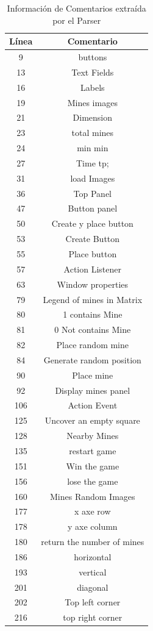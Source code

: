 \documentclass[a4paper,12pt]{report}
\begin{document}
\begin{center}
	\begin{table}[t]
	
		\centering
   		\begin{tabular}{| c | c |}      
       \hline
  	   \textsf{Línea} & \textsf{Comentario} \\ \hline
9&buttons \\ \hline
13&Text Fields \\ \hline
16&Labels \\ \hline
19&Mines images \\ \hline
21&Dimension \\ \hline
23&total mines \\ \hline
24&min min \\ \hline
27&Time tp; \\ \hline
31&load Images \\ \hline
36&Top Panel \\ \hline
47&Button panel \\ \hline
50&Create y place button \\ \hline
53&Create Button \\ \hline
55&Place button \\ \hline
57&Action Listener \\ \hline
63&Window properties \\ \hline
79&Legend of mines in Matrix \\ \hline
80&1 contains Mine \\ \hline
81&0 Not contains Mine \\ \hline
82&Place random mine \\ \hline
84&Generate random position \\ \hline
90&Place mine \\ \hline
92&Display mines panel \\ \hline
106&Action Event \\ \hline
125&Uncover an empty square \\ \hline
128&Nearby Mines \\ \hline
135&restart game \\ \hline
151&Win the game \\ \hline
156&lose the game \\ \hline
160&Mines Random Images \\ \hline
177&x axe row \\ \hline
178&y axe column \\ \hline
180&return the number of mines \\ \hline
186&horizontal \\ \hline
193&vertical \\ \hline
201&diagonal \\ \hline
202&Top left corner \\ \hline
216&top right corner \\ \hline
 	   
  \end{tabular}  
	 
   \caption{Información de Comentarios extraída por el Parser}
   \label{tabla4}
     
  \end{table} 
\end{center}
\end{document}
